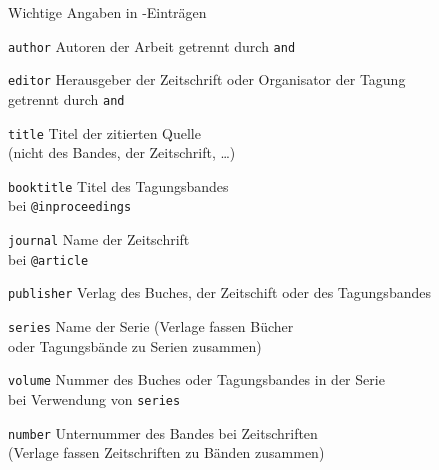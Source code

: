 \begin{Frame}[allowframebreaks]{Wichtige Angaben in \BibTeX-Einträgen}
  \begin{Block}{\texttt{author}}
    Autoren der Arbeit\newline
    getrennt durch \texttt{and}
  \end{Block}

  \begin{Block}{\texttt{editor}}
    Herausgeber der Zeitschrift oder Organisator der Tagung\\
    getrennt durch \texttt{and}
  \end{Block}

  \begin{Block}{\texttt{title}}
    Titel der zitierten Quelle\\
    (nicht des Bandes, der Zeitschrift, \ldots)
  \end{Block}

  \framebreak

  \begin{Block}{\texttt{booktitle}}
    Titel des Tagungsbandes\\
    bei \lstinline-@inproceedings-
  \end{Block}

  \begin{Block}{\texttt{journal}}
    Name der Zeitschrift\\
    bei \lstinline-@article-
  \end{Block}

  \begin{Block}{\texttt{publisher}}
    Verlag des Buches, der Zeitschift oder des Tagungsbandes
  \end{Block}

  \framebreak

  \begin{Block}{\texttt{series}}
    Name der Serie (Verlage fassen Bücher\\
    oder Tagungsbände zu Serien zusammen)
  \end{Block}

  \begin{Block}{\texttt{volume}}
    Nummer des Buches oder Tagungsbandes in der Serie\\
    bei Verwendung von \texttt{series}
  \end{Block}

  \begin{Block}{\texttt{number}}
    Unternummer des Bandes bei Zeitschriften\\
    (Verlage fassen Zeitschriften zu Bänden zusammen)
  \end{Block}


\end{Frame}
